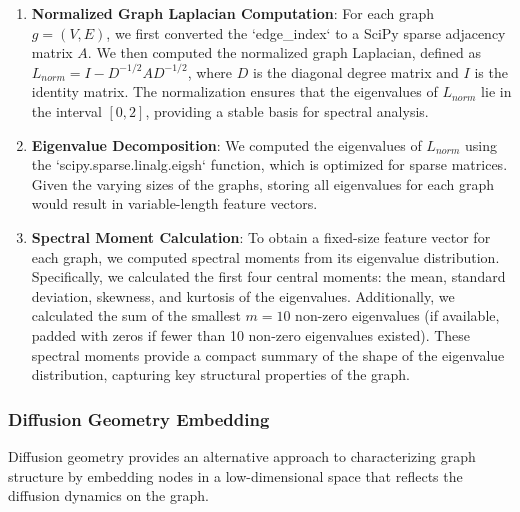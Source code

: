 \documentclass[twocolumn]{aastex631}
\begin{document}
\begin{enumerate}
    \item \textbf{Normalized Graph Laplacian Computation}: For each graph $g = (V, E)$, we first converted the `edge_index` to a SciPy sparse adjacency matrix $A$. We then computed the normalized graph Laplacian, defined as $L_{norm} = I - D^{-1/2} A D^{-1/2}$, where $D$ is the diagonal degree matrix and $I$ is the identity matrix. The normalization ensures that the eigenvalues of $L_{norm}$ lie in the interval $[0, 2]$, providing a stable basis for spectral analysis.

    \item \textbf{Eigenvalue Decomposition}: We computed the eigenvalues of $L_{norm}$ using the `scipy.sparse.linalg.eigsh` function, which is optimized for sparse matrices. Given the varying sizes of the graphs, storing all eigenvalues for each graph would result in variable-length feature vectors.

    \item \textbf{Spectral Moment Calculation}: To obtain a fixed-size feature vector for each graph, we computed spectral moments from its eigenvalue distribution. Specifically, we calculated the first four central moments: the mean, standard deviation, skewness, and kurtosis of the eigenvalues. Additionally, we calculated the sum of the smallest $m=10$ non-zero eigenvalues (if available, padded with zeros if fewer than 10 non-zero eigenvalues existed). These spectral moments provide a compact summary of the shape of the eigenvalue distribution, capturing key structural properties of the graph.
\end{enumerate}

\subsubsection{Diffusion Geometry Embedding}
Diffusion geometry provides an alternative approach to characterizing graph structure by embedding nodes in a low-dimensional space that reflects the diffusion dynamics on the graph.
\end{document}
